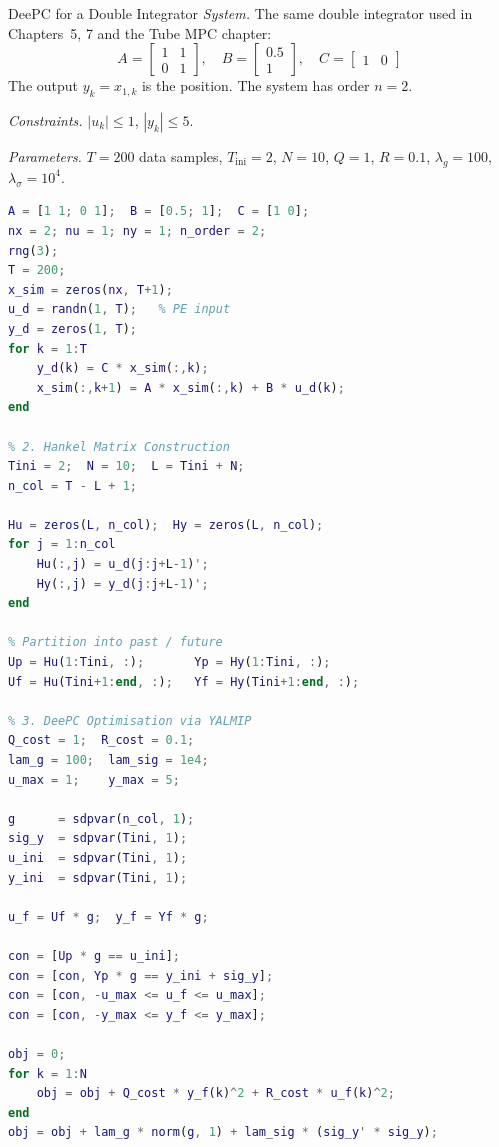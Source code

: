 \begin{examplebox}{DeePC for a Double Integrator}
	\emph{System.} The same double integrator used in Chapters~5, 7 and the Tube MPC chapter:
	\[
	A = \begin{bmatrix} 1 & 1 \\ 0 & 1 \end{bmatrix}, \quad B = \begin{bmatrix} 0.5 \\ 1 \end{bmatrix}, \quad C = \begin{bmatrix} 1 & 0 \end{bmatrix}
	\]
	The output $y_k = x_{1,k}$ is the position. The system has order $n = 2$.

	\emph{Constraints.} $|u_k| \le 1$, $|y_k| \le 5$.

	\emph{Parameters.} $T = 200$ data samples, $T_\text{ini} = 2$, $N = 10$, $Q = 1$, $R = 0.1$, $\lambda_g = 100$, $\lambda_\sigma = 10^4$.

	\solution

\begin{lstlisting}[language=Matlab, caption={DeePC for a constrained double integrator.}]
% 1. Data Collection (persistently exciting input)
A = [1 1; 0 1];  B = [0.5; 1];  C = [1 0];
nx = 2; nu = 1; ny = 1; n_order = 2;
rng(3);
T = 200;
x_sim = zeros(nx, T+1);
u_d = randn(1, T);   % PE input
y_d = zeros(1, T);
for k = 1:T
    y_d(k) = C * x_sim(:,k);
    x_sim(:,k+1) = A * x_sim(:,k) + B * u_d(k);
end

% 2. Hankel Matrix Construction
Tini = 2;  N = 10;  L = Tini + N;
n_col = T - L + 1;

Hu = zeros(L, n_col);  Hy = zeros(L, n_col);
for j = 1:n_col
    Hu(:,j) = u_d(j:j+L-1)';
    Hy(:,j) = y_d(j:j+L-1)';
end

% Partition into past / future
Up = Hu(1:Tini, :);       Yp = Hy(1:Tini, :);
Uf = Hu(Tini+1:end, :);   Yf = Hy(Tini+1:end, :);

% 3. DeePC Optimisation via YALMIP
Q_cost = 1;  R_cost = 0.1;
lam_g = 100;  lam_sig = 1e4;
u_max = 1;    y_max = 5;

g      = sdpvar(n_col, 1);
sig_y  = sdpvar(Tini, 1);
u_ini  = sdpvar(Tini, 1);
y_ini  = sdpvar(Tini, 1);

u_f = Uf * g;  y_f = Yf * g;

con = [Up * g == u_ini];
con = [con, Yp * g == y_ini + sig_y];
con = [con, -u_max <= u_f <= u_max];
con = [con, -y_max <= y_f <= y_max];

obj = 0;
for k = 1:N
    obj = obj + Q_cost * y_f(k)^2 + R_cost * u_f(k)^2;
end
obj = obj + lam_g * norm(g, 1) + lam_sig * (sig_y' * sig_y);


\end{lstlisting}
\end{examplebox}
